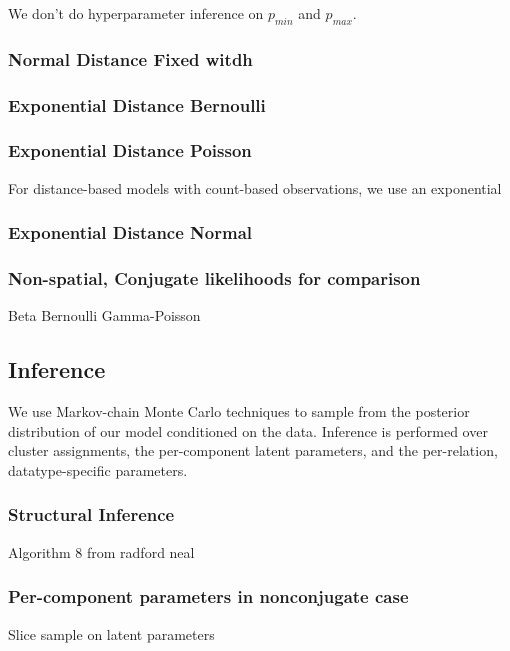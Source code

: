 \documentclass{article}
\begin{document}
We don't do hyperparameter inference on $p_{min}$ and $p_{max}$. 

\subsubsection{Normal Distance Fixed witdh}

\subsubsection{Exponential Distance Bernoulli}


\subsubsection{Exponential Distance Poisson}
For distance-based models with count-based observations, we use an exponential 


\subsubsection{Exponential Distance Normal}


\subsubsection{Non-spatial, Conjugate likelihoods for comparison}
Beta Bernoulli
Gamma-Poisson

\subsection{Inference}

We use Markov-chain Monte Carlo techniques to sample from the posterior 
distribution of our model conditioned on the data. Inference is
performed over cluster assignments, the per-component latent parameters, 
and the per-relation, datatype-specific parameters. 


\subsubsection{Structural Inference}
Algorithm 8 from radford neal \autocite{Neal2000}

\subsubsection{Per-component parameters in nonconjugate case}
Slice sample on latent parameters \autocite{Neal2003}
\end{document}

